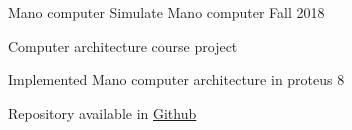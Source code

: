 \begin{cventries}
  \cventry
  {Mano computer} %
  {Simulate Mano computer} %
  {} %
  {Fall 2018} %
  {
    \begin{cvitems} %
      \item {Computer architecture course project}
      \item {Implemented Mano computer architecture in proteus 8}
      \item {Repository available in \textcolor{awesome-red}{\href{https://github.com/ali4heydari/ManoComputer}{Github}}}
    \end{cvitems}
  }




\end{cventries}
